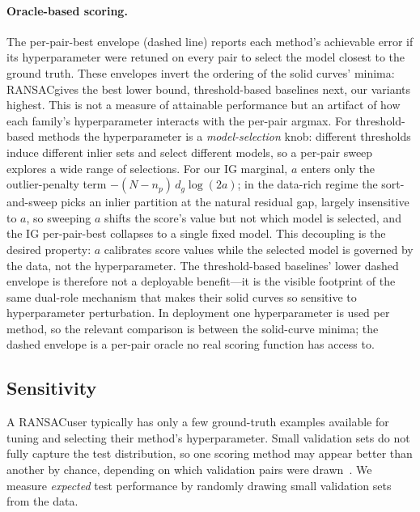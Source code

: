 \documentclass{article}
\newcommand{\mname}[1]{\texorpdfstring{#1\xspace}{#1}}
\newcommand{\ransac}{\mname{RANSAC}}
\newcommand{\sortsweep}{sort-and-sweep\xspace}
\begin{document}
\paragraph{Oracle-based scoring.}
The per-pair-best envelope (dashed line) reports each method's
achievable error if its hyperparameter were retuned on every
pair to select the model closest to the ground truth.  These
envelopes invert the ordering of the solid curves' minima:
\ransac gives the best lower bound, threshold-based baselines
next, our variants highest.
This is not a measure of attainable performance but an
artifact of how each family's hyperparameter interacts with
the per-pair argmax.  For threshold-based methods the
hyperparameter is a \emph{model-selection} knob: different
thresholds induce different inlier sets and select different
models, so a per-pair sweep explores a wide range of
selections.  For our IG marginal, $a$ enters only the
outlier-penalty term $-(N - n_p)\,d_g\log(2a)$; in the data-rich
regime the \sortsweep picks an inlier partition at the
natural residual gap, largely insensitive to $a$, so sweeping
$a$ shifts the score's value but not which model is selected,
and the IG per-pair-best collapses to a single fixed model.
This decoupling is the desired property: $a$ calibrates
score values while the selected model is governed by the
data, not the hyperparameter.  The threshold-based baselines'
lower dashed envelope is therefore not a deployable
benefit---it is the visible footprint of the same dual-role
mechanism that makes their solid curves so sensitive to
hyperparameter perturbation.  In deployment one
hyperparameter is used per method, so the relevant
comparison is between the solid-curve minima; the dashed
envelope is a per-pair oracle no real scoring function has
access to.

\subsection{Sensitivity}
\label{sec:sensitivity-expt}

A \ransac user typically has only a few ground-truth examples
available for tuning and selecting their method's
hyperparameter.  Small validation sets do not fully capture
the test distribution, so one scoring method may appear
better than another by chance, depending on which validation
pairs were drawn~\cite{Shekhovtsov2025}.  We measure
\emph{expected} test performance by randomly drawing small
validation sets from the data.
\end{document}
